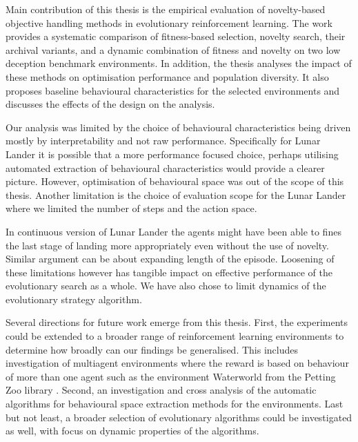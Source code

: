 Main contribution of this thesis is the empirical evaluation of novelty-based objective handling methods in evolutionary reinforcement learning. The work provides a systematic comparison of fitness-based selection, novelty search, their archival variants, and a dynamic combination of fitness and novelty on two low deception benchmark environments. In addition, the thesis analyses the impact of these methods on optimisation performance and population diversity. It also proposes baseline behavioural characteristics for the selected environments and discusses the effects of the design on the analysis.  


Our analysis was limited by the  choice of behavioural characteristics being driven mostly by interpretability and not raw performance. Specifically for Lunar Lander it is possible that a more performance focused choice, perhaps utilising automated extraction of behavioural characteristics \citep{SDBC} would provide a clearer picture. However, optimisation of behavioural space was out of the scope of this thesis.
Another limitation is the choice of evaluation scope for the Lunar Lander where we limited the number of steps and the action space. 

In continuous version of Lunar Lander the agents might have been able to fines the last stage of landing more appropriately even without the use of novelty. Similar argument can be about expanding length of the episode. Loosening of these limitations however has tangible impact on effective performance of the evolutionary search as a whole. 
We have also chose to limit dynamics of the evolutionary strategy algorithm.

Several directions for future work emerge from this thesis. First, the experiments could be extended to a broader range of reinforcement learning environments to determine how broadly can our findings be generalised. This includes investigation of multiagent environments where the reward is based on behaviour of more than one agent such as the environment Waterworld from the Petting Zoo library \citep{pettingzoo}. Second, an investigation and cross analysis of the automatic algorithms for behavioural space extraction methods for the environments. Last but not least, a broader selection of evolutionary algorithms could be investigated as well, with focus on dynamic properties of the algorithms. 




